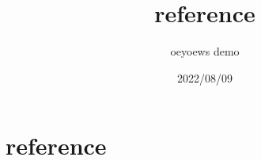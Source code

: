 \documentclass{article}
\title{reference}
\author{oeyoews demo}
\date{2022/08/09}
\begin{document}
\maketitle

\section{reference}
\label{sec:reference}




\cite{Wille1982}
\end{document}
